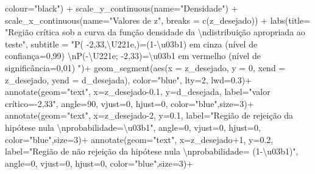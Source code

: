 \documentclass[
]{book}
\newenvironment{Shaded}{\begin{snugshade}}{\end{snugshade}}
\newcommand{\AttributeTok}[1]{\textcolor[rgb]{0.77,0.63,0.00}{#1}}
\newcommand{\DecValTok}[1]{\textcolor[rgb]{0.00,0.00,0.81}{#1}}
\newcommand{\FloatTok}[1]{\textcolor[rgb]{0.00,0.00,0.81}{#1}}
\newcommand{\FunctionTok}[1]{\textcolor[rgb]{0.00,0.00,0.00}{#1}}
\newcommand{\NormalTok}[1]{#1}
\newcommand{\SpecialCharTok}[1]{\textcolor[rgb]{0.00,0.00,0.00}{#1}}
\newcommand{\StringTok}[1]{\textcolor[rgb]{0.31,0.60,0.02}{#1}}
\begin{document}
\begin{Shaded}
\begin{Highlighting}[]
            \AttributeTok{colour=}\StringTok{"black"}\NormalTok{) }\SpecialCharTok{+}
  \FunctionTok{scale\_y\_continuous}\NormalTok{(}\AttributeTok{name=}\StringTok{"Densidade"}\NormalTok{) }\SpecialCharTok{+}
  \FunctionTok{scale\_x\_continuous}\NormalTok{(}\AttributeTok{name=}\StringTok{"Valores de z"}\NormalTok{, }\AttributeTok{breaks =} \FunctionTok{c}\NormalTok{(z\_desejado))  }\SpecialCharTok{+}
  \FunctionTok{labs}\NormalTok{(}\AttributeTok{title=} 
         \StringTok{"Região crítica sob a curva da função densidade da }\SpecialCharTok{\textbackslash{}n}\StringTok{distribuição apropriada ao teste"}\NormalTok{, }
       \AttributeTok{subtitle =} \StringTok{"P( {-}2,33,\textbackslash{}U221e,)=(1{-}\textbackslash{}u03b1) em cinza (nível de confiança=0,99) }\SpecialCharTok{\textbackslash{}n}\StringTok{P({-}\textbackslash{}U221e; {-}2,33)=\textbackslash{}u03b1 em vermelho (nível de significância=0,01) "}\NormalTok{)}\SpecialCharTok{+}
\FunctionTok{geom\_segment}\NormalTok{(}\FunctionTok{aes}\NormalTok{(}\AttributeTok{x =}\NormalTok{ z\_desejado, }\AttributeTok{y =} \DecValTok{0}\NormalTok{, }\AttributeTok{xend =}\NormalTok{ z\_desejado, }\AttributeTok{yend =}\NormalTok{ d\_desejada), }\AttributeTok{color=}\StringTok{"blue"}\NormalTok{, }\AttributeTok{lty=}\DecValTok{2}\NormalTok{, }\AttributeTok{lwd=}\FloatTok{0.3}\NormalTok{)}\SpecialCharTok{+}
\FunctionTok{annotate}\NormalTok{(}\AttributeTok{geom=}\StringTok{"text"}\NormalTok{, }\AttributeTok{x=}\NormalTok{z\_desejado}\FloatTok{{-}0.1}\NormalTok{, }\AttributeTok{y=}\NormalTok{d\_desejada, }\AttributeTok{label=}\StringTok{"valor crítico={-}2,33"}\NormalTok{, }\AttributeTok{angle=}\DecValTok{90}\NormalTok{, }\AttributeTok{vjust=}\DecValTok{0}\NormalTok{, }\AttributeTok{hjust=}\DecValTok{0}\NormalTok{, }\AttributeTok{color=}\StringTok{"blue"}\NormalTok{,}\AttributeTok{size=}\DecValTok{3}\NormalTok{)}\SpecialCharTok{+}
\FunctionTok{annotate}\NormalTok{(}\AttributeTok{geom=}\StringTok{"text"}\NormalTok{, }\AttributeTok{x=}\NormalTok{z\_desejado}\DecValTok{{-}2}\NormalTok{, }\AttributeTok{y=}\FloatTok{0.1}\NormalTok{, }\AttributeTok{label=}\StringTok{"Região de rejeição da hipótese nula }\SpecialCharTok{\textbackslash{}n}\StringTok{probabilidade=\textbackslash{}u03b1"}\NormalTok{, }\AttributeTok{angle=}\DecValTok{0}\NormalTok{, }\AttributeTok{vjust=}\DecValTok{0}\NormalTok{, }\AttributeTok{hjust=}\DecValTok{0}\NormalTok{, }\AttributeTok{color=}\StringTok{"blue"}\NormalTok{,}\AttributeTok{size=}\DecValTok{3}\NormalTok{)}\SpecialCharTok{+}
\FunctionTok{annotate}\NormalTok{(}\AttributeTok{geom=}\StringTok{"text"}\NormalTok{, }\AttributeTok{x=}\NormalTok{z\_desejado}\SpecialCharTok{+}\DecValTok{1}\NormalTok{, }\AttributeTok{y=}\FloatTok{0.2}\NormalTok{, }\AttributeTok{label=}\StringTok{"Região de não rejeição da hipótese nula  }\SpecialCharTok{\textbackslash{}n}\StringTok{probabilidade= (1{-}\textbackslash{}u03b1)"}\NormalTok{, }\AttributeTok{angle=}\DecValTok{0}\NormalTok{, }\AttributeTok{vjust=}\DecValTok{0}\NormalTok{, }\AttributeTok{hjust=}\DecValTok{0}\NormalTok{, }\AttributeTok{color=}\StringTok{"blue"}\NormalTok{,}\AttributeTok{size=}\DecValTok{3}\NormalTok{)}\SpecialCharTok{+}

\end{Highlighting}
\end{Shaded}
\end{document}
